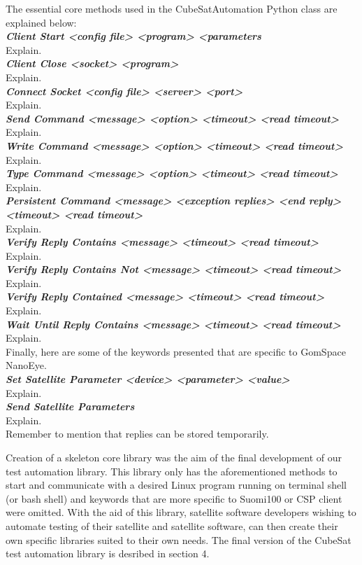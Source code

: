\documentclass[english,12pt,a4paper,pdftex,elec,utf8]{aaltothesis}
\begin{document}
The essential core methods used in the CubeSatAutomation Python class are explained below:\\
\textit{\textbf{Client Start  <config file> <program> <parameters}}\\
Explain.\\
\textit{\textbf{Client Close <socket> <program>}}\\
Explain.\\
\textit{\textbf{Connect Socket <config file> <server> <port>}}\\
Explain.\\
\textit{\textbf{Send Command  <message> <option> <timeout> <read timeout>}}\\
Explain.\\
\textit{\textbf{Write Command  <message> <option> <timeout> <read timeout>}}\\
Explain.\\
\textit{\textbf{Type Command  <message> <option> <timeout> <read timeout>}}\\
Explain.\\
\textit{\textbf{Persistent Command  <message> <exception replies> <end reply> <timeout> <read timeout>}}\\
Explain.\\
\textit{\textbf{Verify Reply Contains  <message> <timeout> <read timeout>}}\\
Explain.\\
\textit{\textbf{Verify Reply Contains Not  <message> <timeout> <read timeout>}}\\
Explain.\\
\textit{\textbf{Verify Reply Contained  <message> <timeout> <read timeout>}}\\
Explain.\\
\textit{\textbf{Wait Until Reply Contains  <message> <timeout> <read timeout>}}\\
Explain.\\
Finally, here are some of the keywords presented that are specific to GomSpace NanoEye.\\
\textit{\textbf{Set Satellite Parameter  <device> <parameter> <value>}}\\
Explain.\\
\textit{\textbf{Send Satellite Parameters}}\\
Explain.\\
Remember to mention that replies can be stored temporarily.\par
Creation of a skeleton core library was the aim of the final development of our test automation library. This library only has the aforementioned methods to start and communicate with a desired Linux program running on terminal shell (or bash shell) and keywords that are more specific to Suomi100 or CSP client were omitted. With the aid of this library, satellite software developers wishing to automate testing of their satellite and satellite software, can then create their own specific libraries suited to their own needs. The final version of the CubeSat test automation library is desribed in section 4.\\
\end{document}

